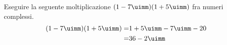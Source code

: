 	Eseguire la seguente moltiplicazione $(1-7\uimm)(1+5\uimm)$ fra numeri complessi.
	\begin{align*}
	(1-7\uimm)(1+5\uimm)=&1+5\uimm-7\uimm-20\\
	=&36-2\uimm
	\end{align*}
